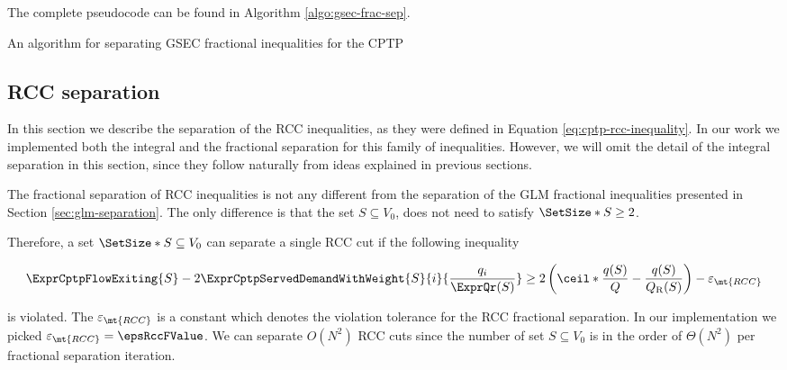 The complete pseudocode can be found in Algorithm \ref{algo:gsec-frac-sep}.

\begin{algorithm}
	\caption{An algorithm for separating GSEC fractional inequalities for the CPTP}
	\label{algo:gsec-frac-sep}
	
\end{algorithm}

\subsection{RCC separation}
\label{sec:impl-rcc-separation}

In this section we describe the separation of the RCC inequalities, as they were defined in Equation \eqref{eq:cptp-rcc-inequality}.
In our work we implemented both the integral and the fractional separation for this family of inequalities.
However, we will omit the detail of the integral separation in this section, since they follow naturally from ideas explained in previous sections.

The fractional separation of RCC inequalities is not any different from the separation of the GLM fractional inequalities presented in Section \ref{sec:glm-separation}.
The only difference is that the set $S \subseteq V_0$, does not need to satisfy $\SetSize*{S} \ge 2$.

Therefore, a set $\SetSize*{S} \subseteq V_0$ can separate a single RCC cut if the following inequality

\begin{equation}
	\begin{split}
		\ExprCptpFlowExiting{S} -2 \ExprCptpServedDemandWithWeight{S}{i}{\frac{q_i}{\ExprQr(S)}}    \ge   2 \left( \ceil*{ \frac{q(S)}{Q}} - \frac{q(S)}{Q_{\mathrm{R}}(S)} \right) - \varepsilon_{\mt{RCC}}
	\end{split}
\end{equation}

is violated.
The $\varepsilon_{\mt{RCC}}$ is a constant which denotes the violation tolerance for the RCC fractional separation.
In our implementation we picked $\varepsilon_{\mt{RCC}} = \epsRccFValue$.
We can separate $O(N^2)$ RCC cuts since the number of set $S \subseteq V_0$ is in the order of $\Theta(N^2)$ per fractional separation iteration.

